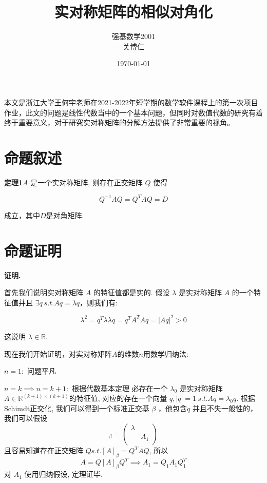 \documentclass[UTF8]{ctexart}
\title{实对称矩阵的相似对角化}
\author{强基数学2001 \\ 关博仁}
\date{\today}
\begin{document}
\maketitle
\newpage

本文是浙江大学王何宇老师在2021-2022年短学期的数学软件课程上的第一次项目作业，此文的问题是线性代数当中的一个基本问题，但同时对数值代数的研究有着终于重要意义，对于研究实对称矩阵的分解方法提供了非常重要的视角。
\section{命题叙述}

\textbf{定理1}$A$ 是一个实对称矩阵, 则存在正交矩阵 $Q$ 使得

\begin{equation}
Q^{-1}AQ = Q^TAQ = D
\end{equation}

成立，其中$D$是对角矩阵.\par

\section{命题证明}

\textbf{证明.}\par
    首先我们说明实对称矩阵 $A$ 的特征值都是实的. 
    假设 $\lambda$ 是实对称矩阵 $A$ 的一个特征值并且 $\exists q\ s.t. Aq = \lambda q$，则我们有:
    
    \begin{equation}
    \lambda^2 = q^T \lambda \lambda q = q^TA^TAq = |Aq|^2 >0  
    \end{equation}
    
    这说明 $\lambda \in \mathbb{R}$.
    
    现在我们开始证明，对实对称矩阵$A$的维数$n$用数学归纳法: \par
    
    $n=1:$ 问题平凡 \par
    $n=k \implies n=k+1:$ 根据代数基本定理
    必存在一个 $\lambda_0$ 是实对称矩阵 $A\in \mathbb{R}^{(k+1)\times (k+1)}$的特征值, 对应的存在一个向量 $q, |q| = 1\ s.t. Aq = \lambda_0 q$. 
    根据Schimdt正交化, 我们可以得到一个标准正交基 $\beta$ ，他包含$q$ 并且不失一般性的，我们可以假设
    \begin{equation}
    [A]_{\beta} = 
    \left(
    \begin{array}{cc}
        \lambda & \\
            & A_1 \\
    \end{array}\right)
    \end{equation}
    且容易知道存在正交矩阵 $Q s.t. [A]_{\beta} = Q^TAQ$, 所以
    \begin{equation}
    A = Q[A]_{\beta}Q^T \implies A_1 = Q_1 A_1 Q_1^T    
    \end{equation}
    对 $A_1$ 使用归纳假设, 定理证毕.
\end{document}
